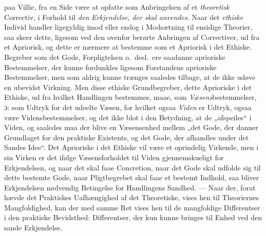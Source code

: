 \documentclass[12pt,a4paper]{book}
\newcommand{\opage}[1]{\marginnote{\footnotesize\textit{[#1]}}}
\begin{document}
paa Villie, fra en Side være at opfatte som Anbringelsen af et \emph{theoretisk} Correctiv, i Forhold til \emph{den Erkjendelse, der skal anvendes}.
Naar det \emph{ethiske} Individ handler ligegyldig imod eller endog i
Modsætning til ensidige Theorier, saa skeer dette, ligesom ved den
ovenfor berørte Anbringen af Correctiver, ud fra et Apriorisk, og dette
er nærmere at bestemme som et Apriorisk i det Ethiske. Begreber som det
Gode, Forpligtelsen o.~desl.\ ere saadanne aprioriske Bestemmelser, der
kunne fordunkles ligesom Forstandens aprioriske Bestemmelser, men som
aldrig kunne trænges saaledes tilbage, at de ikke udøve en ubevidst
Virkning. Men disse ethiske Grundbegreber, dette Aprioriske i det
Ethiske, ud fra hvilket Handlingen bestemmes, maae, som
\emph{Væsens}bestemmelser, ɔ: som Udtryk for det udeelte Væsen, for hvilket
ogsaa \emph{Viden} er Udtryk, ogsaa være Vidensbestemmelser, og det ikke blot
i den Betydning, at de „afspeiles“ i Viden, og saaledes maa der blive
en Væsensenhed mellem „det Gode, der danner Grundlaget for den
praktiske Existents, og det Gode, der afhandles under det Sandes
Idee“. Det Aprioriske i det Ethiske vil være et oprindelig Virkende,
men i sin Virken er det ifølge Væsensforholdet til Viden
gjennemskueligt for Erkjendelsen, og naar det skal faae Concretion,
naar det Gode skal udfolde sig til dette bestemte Gode, naar
Pligtbegrebet skal faae et bestemt Indhold, saa bliver Erkjendelsen
nødvendig Betingelse for Handlingens Sandhed. --- Naar der, forat
hævde det Praktiskes Uafhængighed af det Theoretiske, vises hen til
Theoriernes Mangfoldighed, kan der med samme Ret vises hen til de
mangfoldige Differentser i den prak\opage{146}tiske Bevidsthed: Differentser, der
kun kunne bringes til Enhed ved den sande Erkjendelse.
\end{document}
